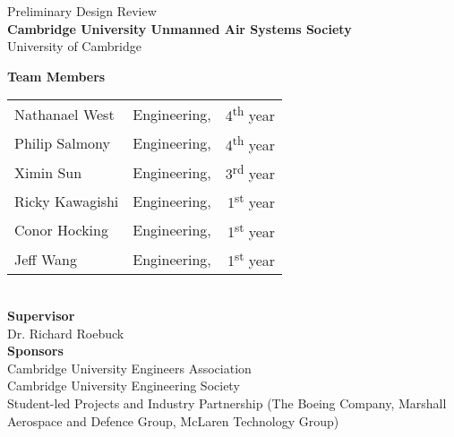 \documentclass[10pt, a4paper]{article}
\begin{document}
\begin{titlepage}
  \begin{center}
    \LARGE
    Preliminary Design Review\\
    \vspace*{0.5cm}
    \Huge
    \textbf{Cambridge University Unmanned Air Systems Society}\\
    \vspace{0.5cm}
    \huge
    University of Cambridge\\
    \vspace{3cm}
    \begin{figure}[H]
	    \centering
	    \def\svgwidth{0.25\textwidth}
	    
    \end{figure}
    \vspace{3cm}
    \large
    \centering\textbf{Team Members}\\
    \vspace{0.2cm}
    \begin{tabularx}{0.75\textwidth}{X l r}
      Nathanael West        & Engineering,      &  4\textsuperscript{th} year\\
      Philip Salmony        & Engineering,      &  4\textsuperscript{th} year\\
      Ximin Sun             & Engineering,      &  3\textsuperscript{rd} year\\
      Ricky Kawagishi       & Engineering,      &  1\textsuperscript{st} year\\
      Conor Hocking         & Engineering,      &  1\textsuperscript{st} year\\
      Jeff Wang             & Engineering,      &  1\textsuperscript{st} year\\
    \end{tabularx} \\
    \vspace{0.5cm}
    \textbf{Supervisor}\\
    \vspace{0.1cm}
    Dr. Richard Roebuck\\
    \vspace{0.5cm}
    \textbf{Sponsors}\\
    \vspace{0.1cm}
    Cambridge University Engineers Association\\
    Cambridge University Engineering Society\\
    Student-led Projects and Industry Partnership (The Boeing Company, Marshall Aerospace and Defence Group, McLaren Technology Group)\\
  \end{center}
\end{titlepage}
\end{document}
